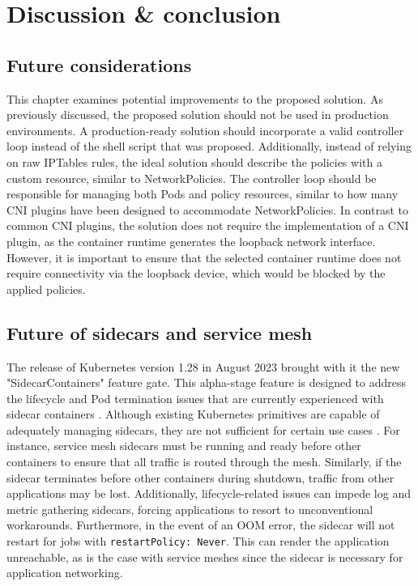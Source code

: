 \documentclass[english, 12pt, a4paper, sci, utf8, a-2b, online]{aaltothesis}
\begin{document}
\clearpage

\section{Discussion \& conclusion} \label{sec:discussion}

\subsection{Future considerations}

This chapter examines potential improvements to the proposed solution.
As previously discussed, the proposed solution should not be used in production environments.
A production-ready solution should incorporate a valid controller loop instead of the shell script that was proposed.
Additionally, instead of relying on raw IPTables rules, the ideal solution should describe the policies with a custom resource, similar to NetworkPolicies.
The controller loop should be responsible for managing both Pods and policy resources, similar to how many CNI plugins have been designed to accommodate NetworkPolicies.
In contrast to common CNI plugins, the solution does not require the implementation of a CNI plugin, as the container runtime generates the loopback network interface.
However, it is important to ensure that the selected container runtime does not require connectivity via the loopback device, which would be blocked by the applied policies.

\subsection{Future of sidecars and service mesh}

The release of Kubernetes version 1.28 in August 2023 brought with it the new "SidecarContainers" feature gate.
This alpha-stage feature is designed to address the lifecycle and Pod termination issues that are currently experienced with sidecar containers \cite{k8s-v1-28-changelog}.
Although existing Kubernetes primitives are capable of adequately managing sidecars, they are not sufficient for certain use cases \cite{k8s-sidecar-kep}.
For instance, service mesh sidecars must be running and ready before other containers to ensure that all traffic is routed through the mesh.
Similarly, if the sidecar terminates before other containers during shutdown, traffic from other applications may be lost.
Additionally, lifecycle-related issues can impede log and metric gathering sidecars, forcing applications to resort to unconventional workarounds.
Furthermore, in the event of an OOM error, the sidecar will not restart for jobs with \lstinline{restartPolicy: Never}.
This can render the application unreachable, as is the case with service meshes since the sidecar is necessary for application networking.
\end{document}
